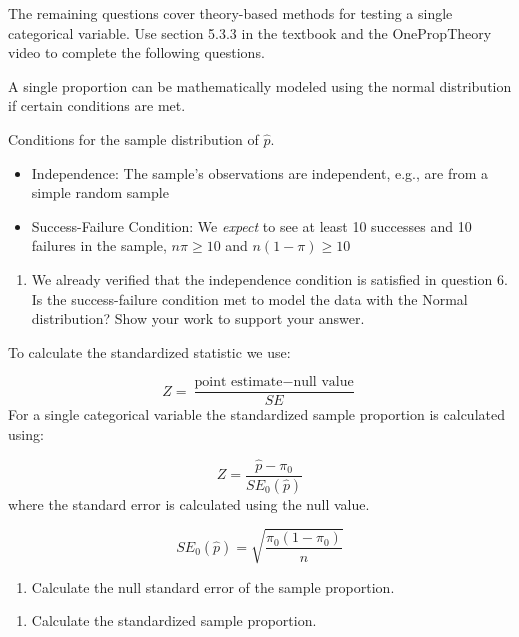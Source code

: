 \documentclass[
]{report}
\providecommand{\tightlist}{%
  \setlength{\itemsep}{0pt}\setlength{\parskip}{0pt}}
\begin{document}
The remaining questions cover theory-based methods for testing a single categorical variable. Use section 5.3.3 in the textbook and the OnePropTheory video to complete the following questions.

A single proportion can be mathematically modeled using the normal distribution if certain conditions are met.

Conditions for the sample distribution of \(\hat{p}\).

\begin{itemize}
\item
  Independence: The sample's observations are independent, e.g., are from a simple random sample
\item
  Success-Failure Condition: We \emph{expect} to see at least 10 successes and 10 failures in the sample, \(n\pi≥10\) and \(n(1-\pi)≥10\)
\end{itemize}

\begin{enumerate}
\def\labelenumi{\arabic{enumi}.}
\tightlist
\item
  We already verified that the independence condition is satisfied in question 6. Is the success-failure condition met to model the data with the Normal distribution? Show your work to support your answer.
\end{enumerate}

\vspace{1in}

To calculate the standardized statistic we use:

\[
Z = \frac{\text{point estimate} - \text{null value}}{SE}
\]
For a single categorical variable the standardized sample proportion is calculated using:

\[
Z = \frac{\hat{p} - \pi_0}{SE_0(\hat{p})}
\]
where the standard error is calculated using the null value.

\[SE_0(\hat{p})=\sqrt{\frac{\pi_0(1-\pi_0)}{n}}\]
\vspace{0.5mm}

\begin{enumerate}
\def\labelenumi{\arabic{enumi}.}
\setcounter{enumi}{1}
\tightlist
\item
  Calculate the null standard error of the sample proportion.
\end{enumerate}

\vspace{1in}

\begin{enumerate}
\def\labelenumi{\arabic{enumi}.}
\setcounter{enumi}{2}
\tightlist
\item
  Calculate the standardized sample proportion.
\end{enumerate}
\end{document}
